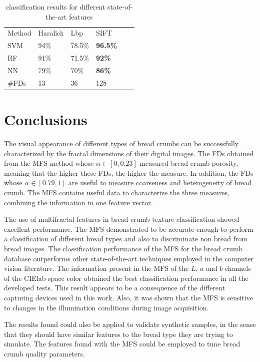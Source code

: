 \begin{table}
\caption{classification results for different state-of-the-art features}
\label{tab:other}       %
\begin{tabular}{llllll}
\hline\noalign{\smallskip}
Method & Haralick & Lbp & SIFT\\ %
\noalign{\smallskip}\hline\noalign{\smallskip}
SVM & 94\% & 78.5\% & \textbf{96.5\%} \\ %
RF  & 91\% & 71.5\% & \textbf{92\%} \\ %
NN & 79\% & 70\% & \textbf{86\%} \\ %
\noalign{\smallskip}\hline
\#FDs & 13 & 36 & 128 \\
\hline
\end{tabular}
\end{table}




\section{Conclusions}
\label{sec:11}
The visual appearance of different types of bread crumbs can be successfully characterized by the fractal dimensions of their digital images. The FDs obtained from the MFS method whose $\alpha \in [0,0.23]$ measured bread crumb porosity, meaning that the higher these FDs, the higher the measure. In addition, the FDs whose $\alpha \in [0.79,1]$ are useful to measure coarseness and heterogeneity of bread crumb. The MFS contains useful data to characterize the three measures, combining the information in one feature vector.

The use of multifractal features in bread crumb texture classification showed excellent performance. The MFS demonstrated to be accurate enough to perform a classification of different bread types and also to discriminate non bread from bread images. The classification performance of the MFS for the bread crumb database outperforms other state-of-the-art techniques employed in the computer vision literature. The information present in the MFS of the $L$, $a$ and $b$ channels of the CIElab space color obtained the best classification performance in all the developed tests. This result appears to be a consequence of the different capturing devices used in this work. Also, it was shown that the MFS is sensitive to changes in the illumination conditions during image acquisition.

The results found could also be applied to validate synthetic samples, in the sense that they should have similar features to the bread type they are trying to simulate. The features found with the MFS could be employed to tune bread crumb quality parameters.

